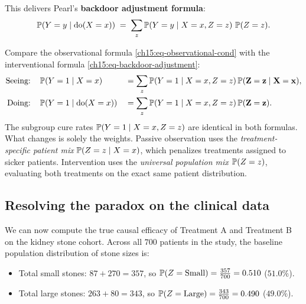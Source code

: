 This delivers Pearl's \textbf{backdoor adjustment formula}:
\begin{equation}
\label{ch15:eq-backdoor-adjustment}
  \P(Y = y \given \operatorname{do}(X = x))
  \;=\; \sum_{z} \P(Y = y \given X = x, Z = z)\,\P(Z = z).
\end{equation}

\begin{happeningbox}
Compare the observational formula \eqref{ch15:eq-observational-cond} with the interventional formula \eqref{ch15:eq-backdoor-adjustment}:
\[
  \begin{aligned}
    \text{Seeing:}\quad &\P(Y = 1 \given X = x) &&= \sum_z \P(Y = 1 \given X = x, Z = z)\,\mathbf{\P(Z = z \given X = x)}, \\
    \text{Doing:}\quad &\P(Y = 1 \given \operatorname{do}(X = x)) &&= \sum_z \P(Y = 1 \given X = x, Z = z)\,\mathbf{\P(Z = z)}.
  \end{aligned}
\]
The subgroup cure rates $\P(Y = 1 \given X = x, Z = z)$ are identical in both formulas. What changes is solely the weights.
Passive observation uses the \emph{treatment-specific patient mix} $\P(Z = z \given X = x)$, which penalizes treatments assigned to sicker patients.
Intervention uses the \emph{universal population mix} $\P(Z = z)$, evaluating both treatments on the exact same patient distribution.
\end{happeningbox}

\subsection{Resolving the paradox on the clinical data}
\label{ch15:resolving-kidney-paradox}

We can now compute the true causal efficacy of Treatment A and Treatment B on the kidney stone cohort.
Across all $700$ patients in the study, the baseline population distribution of stone sizes is:
\begin{itemize}
  \item Total small stones: $87 + 270 = 357$, so $\P(Z = \text{Small}) = \frac{357}{700} = 0.510$ ($51.0\%$).
  \item Total large stones: $263 + 80 = 343$, so $\P(Z = \text{Large}) = \frac{343}{700} = 0.490$ ($49.0\%$).
\end{itemize}


